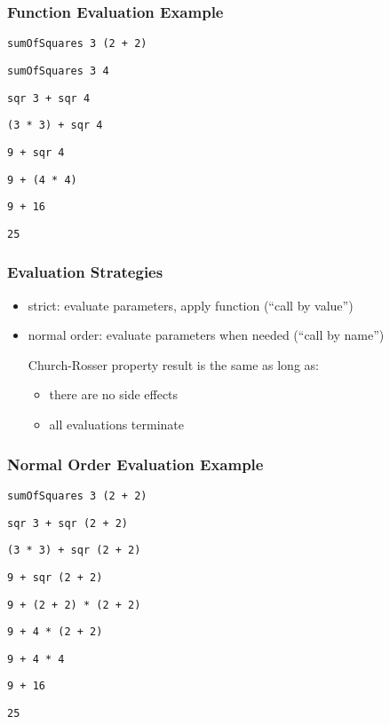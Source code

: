 \documentclass[dvipsnames]{beamer}
\theoremstyle{plain}
\begin{document}
\begin{frame}
  \frametitle{Function Evaluation Example}

  \lstinline|sumOfSquares 3 (2 + 2)|

  \pause
  \medskip
  \lstinline|sumOfSquares 3 4|

  \pause
  \medskip
  \lstinline|sqr 3 + sqr 4|

  \pause
  \medskip
  \lstinline|(3 * 3) + sqr 4 |

  \pause
  \medskip
  \lstinline|9 + sqr 4|

  \pause
  \medskip
  \lstinline|9 + (4 * 4)|

  \pause
  \medskip
  \lstinline|9 + 16|

  \pause
  \medskip
  \lstinline|25|
\end{frame}

\begin{frame}
  \frametitle{Evaluation Strategies}

  \begin{itemize}
    \item \alert{strict}: evaluate parameters, apply function
      (``call by value'')

    \pause
    \medskip
    \item \alert{normal order}: evaluate parameters when needed
      (``call by name'')

    \pause
    \medskip
    \begin{block}{Church-Rosser property}
      result is the same as long as:
      \begin{itemize}
        \item there are no side effects
        \item all evaluations terminate
      \end{itemize}
    \end{block}
  \end{itemize}
\end{frame}

\begin{frame}
  \frametitle{Normal Order Evaluation Example}

  \lstinline|sumOfSquares 3 (2 + 2)|

  \pause
  \medskip
  \lstinline|sqr 3 + sqr (2 + 2)|

  \pause
  \medskip
  \lstinline|(3 * 3) + sqr (2 + 2)|

  \pause
  \medskip
  \lstinline|9 + sqr (2 + 2)|

  \pause
  \medskip
  \lstinline|9 + (2 + 2) * (2 + 2)|

  \pause
  \medskip
  \lstinline|9 + 4 * (2 + 2)|

  \pause
  \medskip
  \lstinline|9 + 4 * 4|

  \pause
  \medskip
  \lstinline|9 + 16|

  \pause
  \medskip
  \lstinline|25|
\end{frame}
\end{document}
